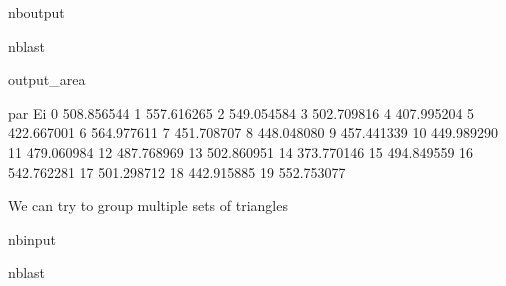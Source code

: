 \documentclass[letterpaper,10pt,english]{sphinxmanual}
\begin{document}
\begin{sphinxuseclass}{nboutput}
\begin{sphinxuseclass}{nblast}
{\begin{sphinxuseclass}{output_area}
\begin{sphinxuseclass}{}
\begin{sphinxVerbatim}[commandchars=\\\{\}]
        par Ei
0   508.856544
1   557.616265
2   549.054584
3   502.709816
4   407.995204
5   422.667001
6   564.977611
7   451.708707
8   448.048080
9   457.441339
10  449.989290
11  479.060984
12  487.768969
13  502.860951
14  373.770146
15  494.849559
16  542.762281
17  501.298712
18  442.915885
19  552.753077
\end{sphinxVerbatim}



\end{sphinxuseclass}
\end{sphinxuseclass}
}

\end{sphinxuseclass}
\end{sphinxuseclass}
\sphinxAtStartPar
We can try to group multiple sets of triangles

\begin{sphinxuseclass}{nbinput}
\begin{sphinxuseclass}{nblast}
{
\begin{sphinxVerbatim}[commandchars=\\\{\}]
\llap{\color{nbsphinxin}[5]:\,\hspace{\fboxrule}\hspace{\fboxsep}}  
  \PYG{p}{[}     \PYG{p}{]}

  
  \PYG{p}{[}     \PYG{p}{]}

  
  \PYG{p}{[}     \PYG{p}{]}
\end{sphinxVerbatim}
}

\end{sphinxuseclass}
\end{sphinxuseclass}
\end{document}
